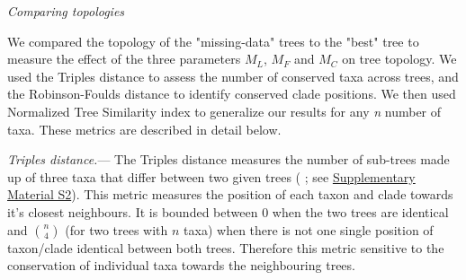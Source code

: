\documentclass[12pt,letterpaper]{article}
\renewcommand{\subsection}[1]{%
\bigskip
\begin{center}
\begin{large}
\normalfont\itshape #1
\end{large}
\end{center}}
\renewcommand{\subsubsection}[1]{%
\vspace{2ex}
\noindent
\textit{#1.}---}
\begin{document}

\subsection{Comparing topologies}
We compared the topology of the "missing-data" trees to the "best" tree to measure the effect of the three parameters $M_{L}$, $M_{F}$ and $M_{C}$ on tree topology.
We used the Triples distance \citep{dobson1975triplets} to assess the number of conserved taxa across trees, and the Robinson-Foulds distance \citep{RF1981} to identify conserved clade positions.
We then used Normalized Tree Similarity index \citep{Bogdanowicz2012} to generalize our results for any \textit{n} number of taxa.
These metrics are described in detail below.

\subsubsection{Triples distance}
The Triples distance \citep{dobson1975triplets} measures the number of sub-trees made up of three taxa that differ between two given trees (\citealt{critchlowthe1996} ; see \hyperref[SupplementaryMaterial]{Supplementary Material S2}).
This metric measures the position of each taxon and clade towards it's closest neighbours.
It is bounded between 0 when the two trees are identical and $\binom{n}{4}$ (for two trees with $n$ taxa) when there is not one single position of taxon/clade identical between both trees.
Therefore this metric sensitive to the conservation of individual taxa towards the neighbouring trees.
\end{document}

